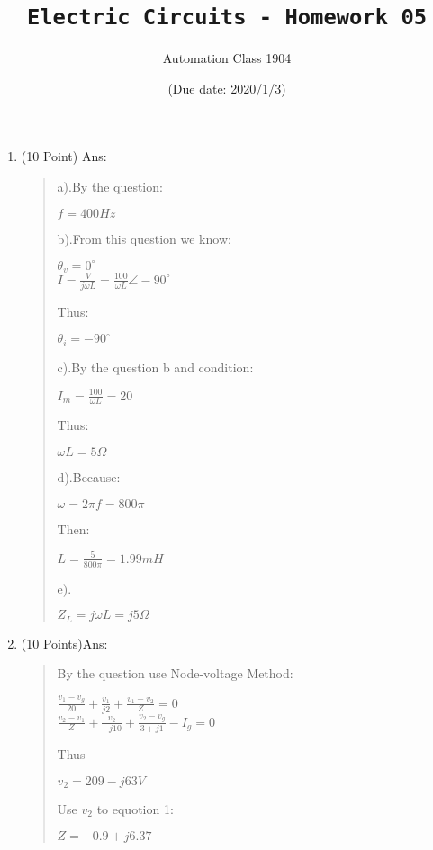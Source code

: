 \documentclass[12pt,a4paper]{article}
\title{\textbf{\texttt{Electric Circuits - Homework 05}}}
\author{Automation Class 1904}
\date{(Due date: 2020/1/3)}%
\begin{document}
	\maketitle
	
	\begin{enumerate}	
		\item (10 Point)
			Ans:
		\begin{quote}
			a).By the question:
			\begin{center}
				$f=400Hz$
			\end{center}
			b).From this question we know:
			\begin{center}
				$\theta_v = 0^{\circ}$\\
				$I=\frac{V}{j\omega L} = \frac{100}{\omega L}\angle-90^{\circ}$
			\end{center}
			Thus:
			\begin{center}
				$\theta_i = -90^{\circ}$
			\end{center}
			c).By the question b and condition:
			\begin{center}
				$I_m=\frac{100}{\omega L} = 20$
			\end{center}
			Thus:
			\begin{center}
				$\omega L = 5\Omega$
			\end{center}
			d).Because:
			\begin{center}
				$\omega = 2\pi f=800\pi$
			\end{center}
			Then:
			\begin{center}
				$L = \frac{5}{800\pi}=1.99mH$
			\end{center}
			e).
			\begin{center}
				$Z_L=j\omega L=j5\Omega$
			\end{center}
		\end{quote}
		\clearpage %
		
		\item (10 Points)Ans:
		\begin{quote}
			By the question use Node-voltage Method:
			\begin{center}
				$\frac{v_1-v_g}{20}+\frac{v_1}{j2}+\frac{v_1-v_2}{Z} = 0$\\
				$\frac{v_2-v_1}{Z}+\frac{v_2}{-j10}+\frac{v_2-v_g}{3+j1}-I_g=0$
			\end{center}
			Thus 
			\begin{center}
				$v_2=209-j63 V$
			\end{center}
			Use $v_2$ to equotion 1:
			\begin{center}
				$Z=-0.9+j6.37$
			\end{center}
		\end{quote}
		\clearpage
		

\end{enumerate}
\end{document}
